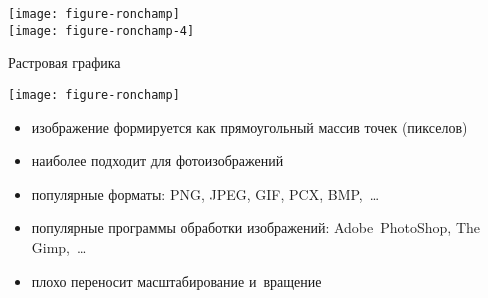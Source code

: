 {\texttt{[image: figure-ronchamp]}\\
\texttt{[image: figure-ronchamp-4]}}


\begin{frame}{Растровая графика}
\centerline{\texttt{[image: figure-ronchamp]}}
\begin{itemize}
\item изображение формируется как прямоугольный массив точек (пикселов)
\item наиболее подходит для фотоизображений
\item популярные форматы: PNG, JPEG, GIF, PCX, BMP,~…
\item популярные программы обработки изображений: Adobe~PhotoShop, The Gimp,~…
\item плохо переносит масштабирование и~вращение
\end{itemize}
\end{frame}


